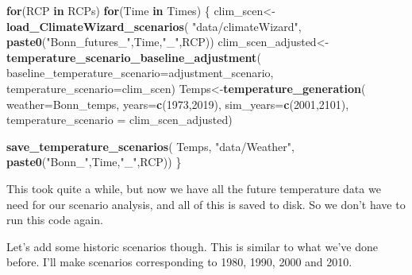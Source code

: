 \documentclass[
]{book}
\newenvironment{Shaded}{\begin{snugshade}}{\end{snugshade}}
\newcommand{\ControlFlowTok}[1]{\textcolor[rgb]{0.13,0.29,0.53}{\textbf{#1}}}
\newcommand{\DataTypeTok}[1]{\textcolor[rgb]{0.13,0.29,0.53}{#1}}
\newcommand{\DecValTok}[1]{\textcolor[rgb]{0.00,0.00,0.81}{#1}}
\newcommand{\KeywordTok}[1]{\textcolor[rgb]{0.13,0.29,0.53}{\textbf{#1}}}
\newcommand{\NormalTok}[1]{#1}
\newcommand{\StringTok}[1]{\textcolor[rgb]{0.31,0.60,0.02}{#1}}
\begin{document}
\begin{Shaded}
\begin{Highlighting}[]
\ControlFlowTok{for}\NormalTok{(RCP }\ControlFlowTok{in}\NormalTok{ RCPs)}
  \ControlFlowTok{for}\NormalTok{(Time }\ControlFlowTok{in}\NormalTok{ Times)}
\NormalTok{    \{}
\NormalTok{     clim_scen<-}\KeywordTok{load_ClimateWizard_scenarios}\NormalTok{(}
       \StringTok{"data/climateWizard"}\NormalTok{,}
       \KeywordTok{paste0}\NormalTok{(}\StringTok{"Bonn_futures_"}\NormalTok{,Time,}\StringTok{"_"}\NormalTok{,RCP))}
\NormalTok{     clim_scen_adjusted<-}
\StringTok{       }\KeywordTok{temperature_scenario_baseline_adjustment}\NormalTok{(}
         \DataTypeTok{baseline_temperature_scenario=}\NormalTok{adjustment_scenario,}
         \DataTypeTok{temperature_scenario=}\NormalTok{clim_scen)}
\NormalTok{     Temps<-}\KeywordTok{temperature_generation}\NormalTok{(}
       \DataTypeTok{weather=}\NormalTok{Bonn_temps, }
       \DataTypeTok{years=}\KeywordTok{c}\NormalTok{(}\DecValTok{1973}\NormalTok{,}\DecValTok{2019}\NormalTok{),}
       \DataTypeTok{sim_years=}\KeywordTok{c}\NormalTok{(}\DecValTok{2001}\NormalTok{,}\DecValTok{2101}\NormalTok{),}
       \DataTypeTok{temperature_scenario =}\NormalTok{ clim_scen_adjusted)}
     
     \KeywordTok{save_temperature_scenarios}\NormalTok{(}
\NormalTok{       Temps,}
       \StringTok{"data/Weather"}\NormalTok{,}
       \KeywordTok{paste0}\NormalTok{(}\StringTok{"Bonn_"}\NormalTok{,Time,}\StringTok{"_"}\NormalTok{,RCP))}
\NormalTok{  \}}
\end{Highlighting}
\end{Shaded}

This took quite a while, but now we have all the future temperature data we need for our scenario analysis, and all of this is saved to disk. So we don't have to run this code again.

Let's add some historic scenarios though. This is similar to what we've done before. I'll make scenarios corresponding to 1980, 1990, 2000 and 2010.
\end{document}

